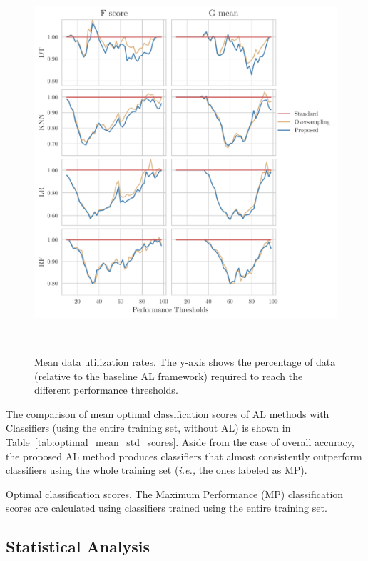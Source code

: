 \documentclass[parskip=full]{scrartcl}
\begin{document}
\begin{figure}[H]
	\centering
	\includegraphics[width=.8\linewidth]{../analysis/data_utilization_rate}
    \caption{%
        Mean data utilization rates. The y-axis shows the percentage of data
        (relative to the baseline AL framework) required to reach the
        different performance thresholds.
    }~\label{fig:dur}
\end{figure}

The comparison of mean optimal classification scores of AL methods with
Classifiers (using the entire training set, without AL) is shown in
Table~\ref{tab:optimal_mean_std_scores}. Aside from the case of overall
accuracy, the proposed AL method produces classifiers that almost consistently
outperform classifiers using the whole training set (\textit{i.e.,} the ones
labeled as MP).

\begin{table}[H]
    \centering
    \caption{\label{tab:optimal_mean_std_scores}
        Optimal classification scores. The Maximum Performance (MP)
        classification scores are calculated using classifiers trained using
        the entire training set.
    }
\end{table}

\subsection{Statistical Analysis}~\label{sec:statistical-analysis}
\end{document}
